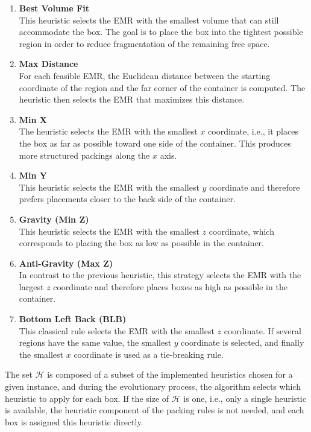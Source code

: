 \begin{enumerate}

\item \textbf{Best Volume Fit} \\
This heuristic selects the EMR with the smallest volume that can still accommodate the box. 
The goal is to place the box into the tightest possible region in order to reduce fragmentation of the remaining free space.

\item \textbf{Max Distance} \\
For each feasible EMR, the Euclidean distance between the starting coordinate of the region and the far corner of the container is computed. 
The heuristic then selects the EMR that maximizes this distance. 

\item \textbf{Min X} \\
The heuristic selects the EMR with the smallest $x$ coordinate, i.e., it places the box as far as possible toward one side of the container. 
This produces more structured packings along the $x$ axis.

\item \textbf{Min Y} \\
This heuristic selects the EMR with the smallest $y$ coordinate and therefore prefers placements closer to the back side of the container.

\item \textbf{Gravity (Min Z)} \\
This heuristic selects the EMR with the smallest $z$ coordinate, which corresponds to placing the box as low as possible in the container. 

\item \textbf{Anti-Gravity (Max Z)} \\
In contrast to the previous heuristic, this strategy selects the EMR with the largest $z$ coordinate and therefore places boxes as high as possible in the container. 

\item \textbf{Bottom Left Back (BLB)} \\
This classical rule selects the EMR with the smallest $z$ coordinate. If several regions have the same value, the smallest $y$ coordinate is selected, and finally the smallest $x$ coordinate is used as a tie-breaking rule. 

\end{enumerate}

The set $\mathcal{H}$ is composed of a subset of the implemented heuristics chosen for a given instance, and during the evolutionary process, the algorithm selects which heuristic to apply for each box. 
If the size of $\mathcal{H}$ is one, i.e., only a single heuristic is available, the heuristic component of the packing rules is not needed, 
and each box is assigned this heuristic directly.

